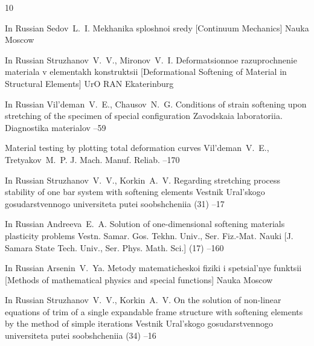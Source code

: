 \begin{thebibliography}{10}

\lang In Russian
\by Sedov~L.~I.
\book Mekhanika sploshnoi sredy \rm [Continuum Mechanics] 
\publ Nauka
\publaddr Moscow

\lang In Russian
\by Struzhanov~V.~V., Mironov~V.~I.
\book Deformatsionnoe razuprochnenie materiala v elementakh konstruktsii \rm [Deformational Softening of Material in Structural Elements]
\publ UrO RAN 
\publaddr Ekaterinburg

\lang In Russian 
\by Vil'deman~V.~E., Chausov~N.~G.
\paper Conditions of strain softening upon stretching of the specimen of special configuration
\jour Zavodskaia laboratoriia. Diagnostika materialov
--59


\paper Material testing  by plotting total deformation curves
\by Vil'deman~V.~E., Tretyakov~M.~P.
\jour J. Mach. Manuf. Reliab.
--170



\lang In Russian
\by Struzhanov~V.~V., Korkin~A.~V.
\paper Regarding stretching process stability of one bar system with softening elements
\jour Vestnik Ural'skogo gosudarstvennogo universiteta putei soobshcheniia
(31)
--17


\lang In Russian
\by Andreeva~E.~A.
\paper Solution of one-dimensional softening materials plasticity problems
\jour Vestn. Samar. Gos. Tekhn. Univ., Ser. Fiz.-Mat. Nauki \rm [J. Samara State Tech. Univ., Ser. Phys. Math. Sci.]
(17)
--160



\lang In Russian
\by Arsenin~V.~Ya.
\book Metody matematicheskoi fiziki i spetsial'nye funktsii \rm [Methods of mathematical physics and special functions]
\publ Nauka
\publaddr Moscow


\lang In Russian
\by Struzhanov~V.~V., Korkin~A.~V.
\paper On the solution of non-linear equations of trim of a single expandable frame structure with softening elements by the method of simple iterations
\jour Vestnik Ural'skogo gosudarstvennogo universiteta putei soobshcheniia
(34)
--16



\end{thebibliography}
